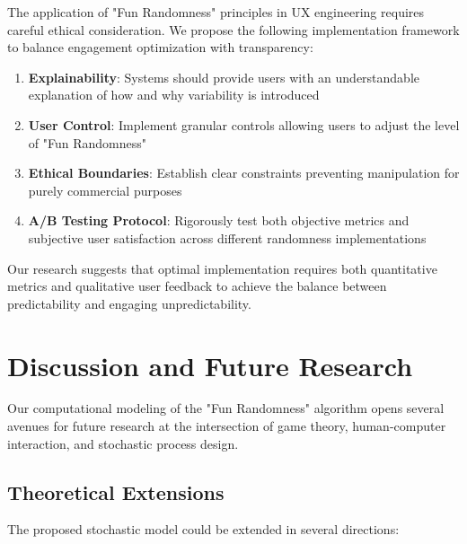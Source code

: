 \documentclass{article}
\begin{document}
The application of "Fun Randomness" principles in UX engineering requires careful ethical consideration. We propose the following implementation framework to balance engagement optimization with transparency:

\begin{enumerate}
    \item \textbf{Explainability}: Systems should provide users with an understandable explanation of how and why variability is introduced
    \item \textbf{User Control}: Implement granular controls allowing users to adjust the level of "Fun Randomness"
    \item \textbf{Ethical Boundaries}: Establish clear constraints preventing manipulation for purely commercial purposes
    \item \textbf{A/B Testing Protocol}: Rigorously test both objective metrics and subjective user satisfaction across different randomness implementations
\end{enumerate}

Our research suggests that optimal implementation requires both quantitative metrics and qualitative user feedback to achieve the balance between predictability and engaging unpredictability.

\section{Discussion and Future Research}

Our computational modeling of the "Fun Randomness" algorithm opens several avenues for future research at the intersection of game theory, human-computer interaction, and stochastic process design.

\subsection{Theoretical Extensions}

The proposed stochastic model could be extended in several directions:
\end{document}
